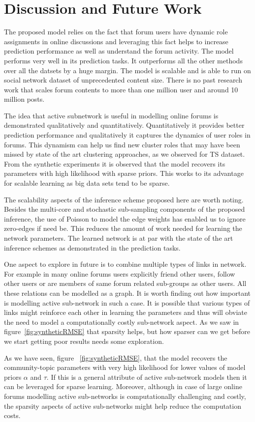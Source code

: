 \documentclass{sig-alternate}
\begin{document}
\section{Discussion and Future Work}
The  proposed model relies on the fact that forum users have dynamic role
assignments in online discussions and leveraging this fact helps to increase
prediction performance as well as understand the forum activity. The model
performs very well in its prediction tasks. It outperforms all the other methods
over all the datsets by a huge margin. The model is scalable and is able to run
on social network dataset of unprecedented content size. There is no past
research work that scales forum contents to more than one  million user and
around 10 million posts. 

The idea that active subnetwork is useful in modelling online forums is
demonstrated qualitatively and quantitatively. Quantitatively it provides better
prediction performance and qualitatively it captures the dynamics of user
roles in forums. This dynamism can help us find new cluster roles that may have
been missed by state of the art clustering approaches, as we observed for
TS dataset. From the synthetic experiments it is observed that the model
recovers its parameters with high likelihood with sparse priors. This works to
its advantage for scalable learning as big data sets tend to be sparse.

The scalability aspects of the inference scheme proposed here are worth noting.
Besides the multi-core and stochastic sub-sampling components of the proposed
inference, the use of Poisson to model the edge weights has enabled us to 
ignore zero-edges if need be. This reduces the amount of work needed for
learning the network parameters. The learned network is at par with the state of the art
inference schemes as demonstrated in the prediction tasks.   

One aspect to explore in future is to combine multiple types of links in
network. For example in many online forums users explicitly friend other users,
follow other users or are members of same forum related sub-groups as other
users. All these relations can be modelled as a graph. It is worth finding out
how important is modelling active sub-network in such a case. It is
possible that various types of links might reinforce each other in learning
the parameters and thus will obviate the need to model a computationally
costly sub-network aspect. As we saw in figure~\ref{fig:syntheticRMSE} that
sparsity helps, but how sparser can we get before we start getting poor results
needs some exploration.

As we have
seen, figure ~\ref{fig:syntheticRMSE}, that the model recovers the
community-topic parameters with very high likelihood for lower values of model
priors $\alpha$ and $\tau$. If this is a general attribute of active sub-network
models then it can be leveraged for sparse learning. Moreover, although in case
of large online forums modelling active sub-networks is computationally
challenging and costly, the sparsity aspects of active sub-networks might help
reduce the computation costs.




\appendix

\end{document}
